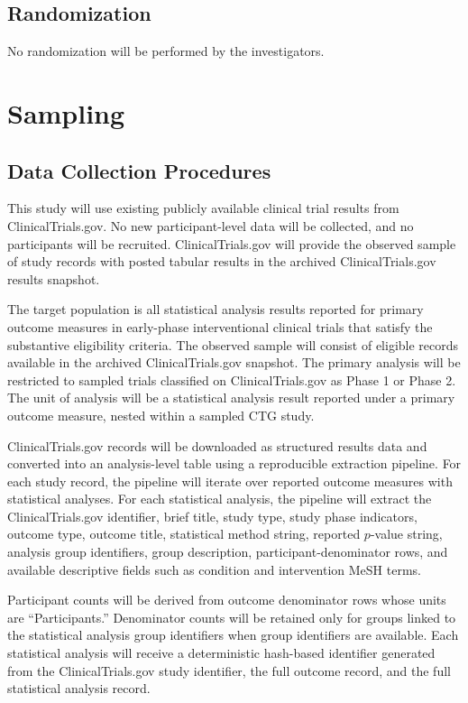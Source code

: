 \documentclass[11pt]{article}
\begin{document}
\subsection{Randomization}

No randomization will be performed by the investigators.

\section{Sampling}

\subsection{Data Collection Procedures}

This study will use existing publicly available clinical trial results from ClinicalTrials.gov. No new participant-level data will be collected, and no participants will be recruited. ClinicalTrials.gov will provide the observed sample of study records with posted tabular results in the archived ClinicalTrials.gov results snapshot.

The target population is all statistical analysis results reported for primary outcome measures in early-phase interventional clinical trials that satisfy the substantive eligibility criteria. The observed sample will consist of eligible records available in the archived ClinicalTrials.gov snapshot. The primary analysis will be restricted to sampled trials classified on ClinicalTrials.gov as Phase 1 or Phase 2. The unit of analysis will be a statistical analysis result reported under a primary outcome measure, nested within a sampled CTG study.

ClinicalTrials.gov records will be downloaded as structured results data and converted into an analysis-level table using a reproducible extraction pipeline. For each study record, the pipeline will iterate over reported outcome measures with statistical analyses. For each statistical analysis, the pipeline will extract the ClinicalTrials.gov identifier, brief title, study type, study phase indicators, outcome type, outcome title, statistical method string, reported \(p\)-value string, analysis group identifiers, group description, participant-denominator rows, and available descriptive fields such as condition and intervention MeSH terms.

Participant counts will be derived from outcome denominator rows whose units are ``Participants.'' Denominator counts will be retained only for groups linked to the statistical analysis group identifiers when group identifiers are available. Each statistical analysis will receive a deterministic hash-based identifier generated from the ClinicalTrials.gov study identifier, the full outcome record, and the full statistical analysis record.
\end{document}
